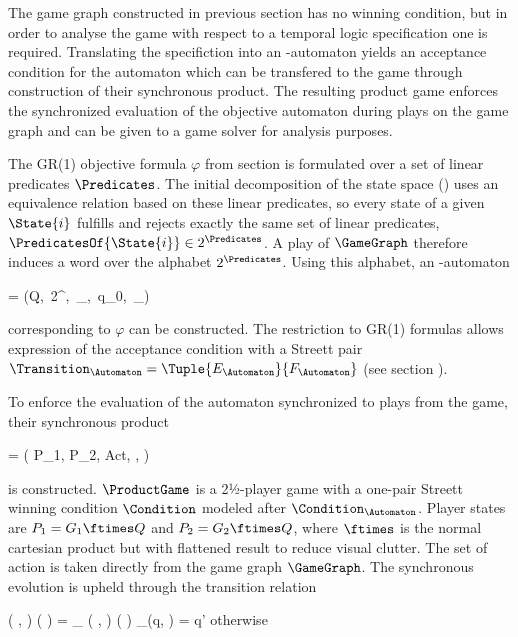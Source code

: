 The game graph constructed in previous section has no winning condition, but in order to analyse the game with respect to a temporal logic specification one is required.
Translating the specifiction into an \omega-automaton yields an acceptance condition for the automaton which can be transfered to the game through construction of their synchronous product.
The resulting product game enforces the synchronized evaluation of the objective automaton during plays on the game graph and can be given to a game solver for analysis purposes.

The GR(1) objective formula $\varphi$ from section  is formulated over a set of linear predicates $\Predicates$.
The initial decomposition of the state space () uses an equivalence relation based on these linear predicates, so every state of a given $\State{i}$ fulfills and rejects exactly the same set of linear predicates, $\PredicatesOf{\State{i}} \in 2^\Predicates$.
A play of $\GameGraph$ therefore induces a word over the alphabet $2^\Predicates$.
Using this alphabet, an \omega-automaton

\startformula
    \Automaton = (Q,\, 2^\Predicates,\, \Transition_\Automaton,\, q_0,\, \Condition_\Automaton)
\stopformula

corresponding to $\varphi$ can be constructed.
The restriction to GR(1) formulas allows expression of the acceptance condition with a Streett pair $\Transition_\Automaton = \Tuple{E_\Automaton}{F_\Automaton}$ (see section ).

To enforce the evaluation of the automaton synchronized to plays from the game, their synchronous product

\startformula
    \ProductGame = ( P_1, P_2, Act, \Transition, \Condition )
\stopformula

is constructed.
$\ProductGame$ is a 2½-player game with a one-pair Streett winning condition $\Condition$ modeled after $\Condition_\Automaton$.
Player states are $P_1 = G_1 \ftimes Q$ and $P_2 = G_2 \ftimes Q$, where $\ftimes$ is the normal cartesian product but with flattened result to reduce visual clutter.
The set of action is taken directly from the game graph $\GameGraph$.
The synchronous evolution is upheld through the transition relation

\startformula
    \Transition
        \Big( ,  \Big)
        \Big(  \Big)
    = \startmathcases
        \NC \Transition_\GameGraph
        \Big( ,  \Big)
        \Big(  \Big)
        \MC \StartIf \Transition_\Automaton(q, ) = q'
        \NR
        \NC otherwise
        \NR
    \stopmathcases
\stopformula

